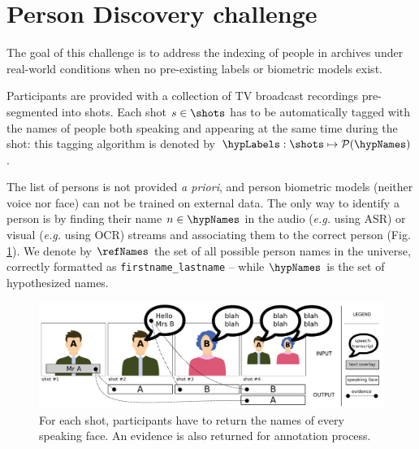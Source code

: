 \section{Person Discovery challenge}
\label{sec:challenge}


The goal of this challenge is to address the indexing of people in archives under real-world conditions when no
 pre-existing labels or biometric models exist.

 Participants are provided with a collection of TV broadcast recordings pre-segmented into shots.
Each shot $s \in \shots$ has to be automatically tagged with the names of people both speaking and appearing at the same time during the shot: this tagging algorithm is denoted by $\hypLabels : \shots \mapsto \mathcal{P}(\hypNames)$.

The list of persons is not provided \emph{a priori}, and person biometric models (neither voice nor face) can not be trained on external data. 
The only way to identify a person is by finding their name $n \in \hypNames$ in the audio (\emph{e.g.} using ASR) or visual (\emph{e.g.} using OCR) streams and associating them to the correct person (Fig. \ref{fig:evidence}). %
We denote by $\refNames$ the set of all possible person names in the universe, correctly formatted as \texttt{firstname\_lastname} -- while $\hypNames$ is the set of hypothesized names.

\begin{figure}[tb]
 \centering
 \includegraphics[width=1.\linewidth]{evidence.pdf}
\vspace*{-5mm}
 \caption{For each shot, participants have to return the names of every speaking face. An evidence is also returned for annotation process.}
\vspace*{-3mm}
 \label{fig:evidence}
\end{figure}

